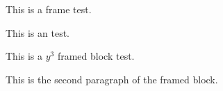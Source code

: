 \documentclass{article}
\begin{document}
This is a  frame test.

This is an  test.

\begin{mdframed}
  This is a $y^3$ framed block test.
  
  This is the second paragraph of the framed block.
\end{mdframed}
\end{document}
